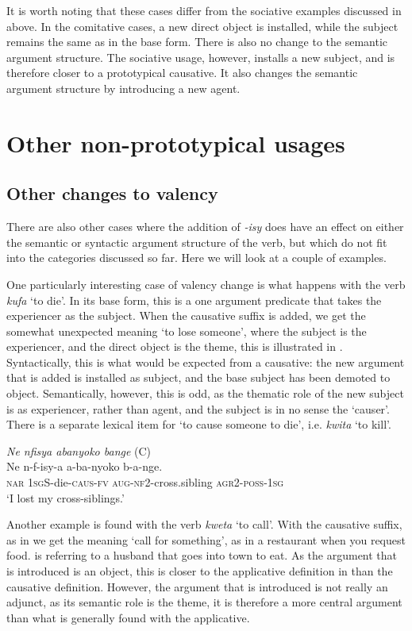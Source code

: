 \documentclass[output=paper,colorlinks,citecolor=brown,draftmode]{langscibook}
\begin{document}
It is worth noting that these cases differ from the sociative examples discussed in  above. In the comitative cases, a new direct object is installed, while the subject remains the same as in the base form. There is also no change to the semantic argument structure. The sociative usage, however, installs a new subject, and is therefore closer to a prototypical causative. It also changes the semantic argument structure by introducing a new agent.  

\section{Other non-prototypical usages}\label{sec:Saebo:diathesis}
\subsection{Other changes to valency}
There are also other cases where the addition of \emph{-isy} does have an effect on either the semantic or syntactic argument structure of the verb, but which do not fit into the categories discussed so far. Here we will look at a couple of examples.

One particularly interesting case of valency change is what happens with the verb \emph{kufa} `to die'. In its base form, this is a one argument predicate that takes the experiencer as the subject. When the causative suffix is added, we get the somewhat unexpected meaning `to lose someone', where the subject is the experiencer, and the direct object is the theme, this is illustrated in . Syntactically, this is what would be expected from a causative: the new argument that is added is installed as subject, and the base subject has been demoted to object. Semantically, however, this is odd, as the thematic role of the new subject is as experiencer, rather than agent, and the subject is in no sense the `causer'. There is a separate lexical item for `to cause someone to die', i.e. \emph{kwita} `to kill'.

\ea \label{ex:Saebo:die} \emph{Ne 	nfisya 			abanyoko 	bange} (C)\\
  \gll  Ne 	n-f-isy-a 			a-ba-nyoko 	b-a-nge. \\ 
\textsc{nar} \textsc{1sg}S-die-\textsc{caus-fv} \textsc{aug-nf2}-cross.sibling \textsc{agr2-poss-1sg} \\
    \glt  `I lost my cross-siblings.' 
      \z

Another example is found with the verb \emph{kweta} `to call'. With the causative suffix, as in  we get the meaning `call for something', as in a restaurant when you request food.  is referring to a husband that goes into town to eat. As the argument that is introduced is an object, this is closer to the applicative definition in  than the causative definition. However, the argument that is introduced is not really an adjunct, as its semantic role is the theme, it is therefore a more central argument than what is generally found with the applicative. 
\end{document}

